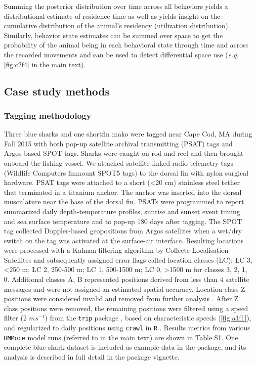 Summing the posterior distribution over time across all behaviors yields
a distributional estimate of residence time \citep{Pedersen2011a} as
well as yields insight on the cumulative distribution of the animal's
residency (utilization distribution). Similarly, behavior state
estimates can be summed over space to get the probability of the animal
being in each behavioral state through time and across the recorded
movements and can be used to detect differential space use (\emph{e.g.} \cref{fig:c2f4}
in the main text).

\subsection*{Case study methods}%

\subsubsection*{Tagging methodology}%

Three blue sharks and one shortfin mako were tagged near Cape Cod, MA
during Fall 2015 with both pop-up satellite archival transmitting (PSAT)
tags and Argos-based SPOT tags. Sharks were caught on rod and reel and
then brought onboard the fishing vessel. We attached satellite-linked
radio telemetry tags (Wildlife Computers finmount SPOT5 tags) to the
dorsal fin with nylon surgical hardware. PSAT tags were attached to a
short (\textless{}20 cm) stainless steel tether that terminated in a
titanium anchor. The anchor was inserted into the dorsal musculature
near the base of the dorsal fin. PSATs were programmed to report
summarized daily depth-temperature profiles, sunrise and sunset event
timing and sea surface temperature and to pop-up 180 days after tagging.
The SPOT tag collected Doppler-based geopositions from Argos satellites
when a wet/dry switch on the tag was activated at the surface-air
interface. Resulting locations were processed with a Kalman filtering
algorithm by Collecte Localisation Satellites \citep{Lopez2014} and
subsequently assigned error flags called location classes (LC): LC 3,
\textless{}250 m; LC 2, 250-500 m; LC 1, 500-1500 m; LC 0,
\textgreater{}1500 m for classes 3, 2, 1, 0. Additional classes A, B
represented positions derived from less than 4 satellite messages and
were not assigned an estimated spatial accuracy. Location class Z
positions were considered invalid and removed from further analysis
\citep{CLS2008}. After Z class positions were removed, the remaining
positions were filtered using a speed filter (2 $m s^{-1}$) from the
\texttt{trip} package \citep{Sumner2015}, based on characteristic speeds
(\cref{fig:a1f1}), and regularized to daily positions using \texttt{crawl}
\citep{Johnson2008a} in \texttt{R} \citep{RDevelopmentCoreTeam2015}.
Results metrics from various \texttt{HMMoce} model runs (referred to in
the main text) are shown in Table S1. One complete blue shark dataset is
included as example data in the package, and its analysis is described
in full detail in the package vignette.

